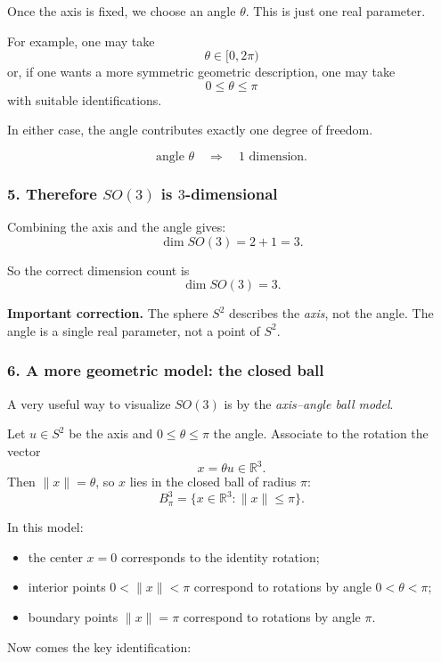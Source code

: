 \documentclass[12pt,a4paper]{article}
\theoremstyle{notespace}
\begin{document}
Once the axis is fixed, we choose an angle \(\theta\).  
This is just one real parameter.

For example, one may take
\[
\theta\in [0,2\pi)
\]
or, if one wants a more symmetric geometric description, one may take
\[
0\le \theta\le \pi
\]
with suitable identifications.

In either case, the angle contributes exactly one degree of freedom.

\[
\boxed{\text{angle } \theta \quad \Longrightarrow \quad 1\text{ dimension}.}
\]

\subsubsection*{5. Therefore \texorpdfstring{\(SO(3)\)}{SO(3)} is \texorpdfstring{\(3\)}{3}-dimensional}

Combining the axis and the angle gives:
\[
\dim SO(3)=2+1=3.
\]

So the correct dimension count is
\[
\boxed{\dim SO(3)=3.}
\]

\medskip

\textbf{Important correction.}  
The sphere \(S^2\) describes the \emph{axis}, not the angle.  
The angle is a single real parameter, not a point of \(S^2\).

\subsubsection*{6. A more geometric model: the closed ball}

A very useful way to visualize \(SO(3)\) is by the \emph{axis--angle ball model}.

Let \(u\in S^2\) be the axis and \(0\le \theta\le \pi\) the angle.  
Associate to the rotation the vector
\[
x=\theta u\in \mathbb R^3.
\]
Then \(\|x\|=\theta\), so \(x\) lies in the closed ball of radius \(\pi\):
\[
B_\pi^3=\{x\in \mathbb R^3 : \|x\|\le \pi\}.
\]

In this model:

\begin{itemize}
	\item the center \(x=0\) corresponds to the identity rotation;
	\item interior points \(0<\|x\|<\pi\) correspond to rotations by angle \(0<\theta<\pi\);
	\item boundary points \(\|x\|=\pi\) correspond to rotations by angle \(\pi\).
\end{itemize}

Now comes the key identification:
\end{document}
